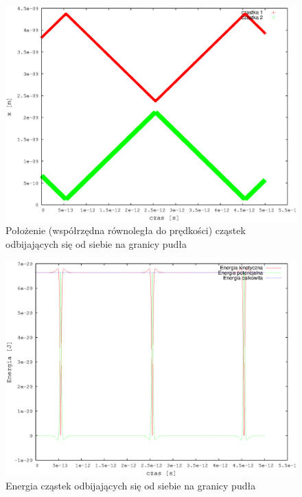 \documentclass[a4paper,10pt]{article}
\begin{document}
\begin{figure}[h]
\begin{center}
\includegraphics[scale=0.6]{wyniki/border-oscilating-particles2-pos.eps}
\caption{Położenie (współrzędna równoległa do prędkości) cząstek odbijających się od siebie na granicy pudła}
\label{pic:collision-border-pos}
\end{center}
\end{figure}
\FloatBarrier

\begin{figure}[h]
\begin{center}
\includegraphics[scale=0.6]{wyniki/border-oscilating-particles2.eps}
\caption{Energia cząstek odbijających się od siebie na granicy pudła}
\label{pic:collision-border-energy}
\end{center}
\end{figure}
\FloatBarrier
\end{document}
